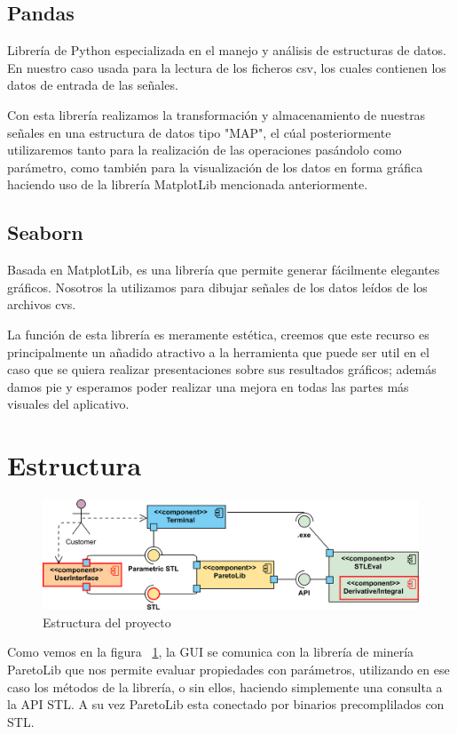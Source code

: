  
 
\subsection{Pandas}
Librería de Python especializada en el manejo y análisis de estructuras de datos. En nuestro caso usada para la lectura de los ficheros csv, los cuales contienen los datos de entrada de las señales.

Con esta librería realizamos la transformación y almacenamiento de nuestras señales en una estructura de datos tipo "MAP", el cúal posteriormente utilizaremos tanto para la realización de las operaciones pasándolo como parámetro, como también para la visualización de los datos en forma gráfica haciendo uso de la librería MatplotLib mencionada anteriormente. 
 
 

\subsection{Seaborn} 
Basada en MatplotLib, es una librería que permite generar fácilmente elegantes gráficos. Nosotros la utilizamos para dibujar señales de los datos leídos de los archivos cvs.

La función de esta librería es meramente estética, creemos que este recurso es principalmente un añadido atractivo a la herramienta que puede ser util en el caso que se quiera realizar presentaciones sobre sus resultados gráficos; además damos pie y esperamos poder realizar una mejora en todas las partes más visuales del aplicativo. 
 
 

\section{Estructura}
\begin{figure}[htb]
\centering
  \includegraphics[width=.95\linewidth]{images/uml_diagram} 
\caption{Estructura del proyecto}
\label{fig:est}
\end{figure}
Como vemos en la figura ~\ref{fig:est}, la GUI se comunica con la librería de minería ParetoLib que nos permite evaluar propiedades con parámetros, utilizando en ese caso los métodos de la librería, o sin ellos, haciendo simplemente una consulta a la API STL. A su vez ParetoLib esta conectado por binarios precomplilados con STL.


